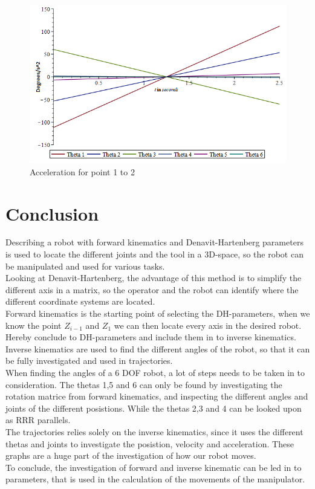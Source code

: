 \begin{figure}[H]
  \centering
  \begin{minipage}[b]{0.45\textwidth}
    \includegraphics[width=\textwidth]{Design/acccb.png}
    \caption{Acceleration for point 1 to 2}
    \label{fig:acceleration}
   \end{minipage}
\end{figure}
 
\section{Conclusion}
Describing a robot with forward kinematics and Denavit-Hartenberg parameters is used to locate the different joints and the tool in a 3D-space, so the robot can be manipulated and used for various tasks.\\
Looking at Denavit-Hartenberg, the advantage of this method is to simplify the different axis in a matrix, so the operator and the robot can identify where the different coordinate systems are located.\\
Forward kinematics is the starting point of selecting the DH-parameters, when we know the point $Z_{i-1}$ and $Z_1$ we can then locate every axis in the desired robot. Hereby conclude to DH-parameters and include them in to inverse kinematics.\\
Inverse kinematics are used to find the different angles of the robot, so that it can be fully investigated and used in trajectories.\\ 
When finding the angles of a 6 DOF robot, a lot of steps needs to be taken in to consideration. The thetas 1,5 and 6 can only be found by investigating the rotation matrice from forward kinematics, and inspecting the different angles and joints of the different posistions. While the thetas 2,3 and 4 can be looked upon as RRR parallels.\\
The trajectories relies solely on the inverse kinematics, since it uses the different thetas and joints to investigate the posistion, velocity and acceleration. These graphs are a huge part of the investigation of how our robot moves.\\
To conclude, the investigation of forward and inverse kinematic can be led in to parameters, that is used in the calculation of the movements of the manipulator.\\







